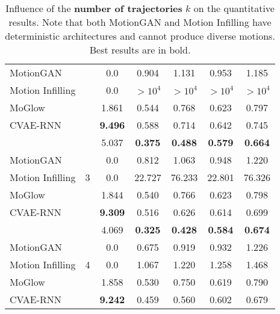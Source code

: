 \documentclass[10pt,twocolumn,letterpaper]{article}
\begin{document}
\begin{table}[t!]
\begin{tabular}{lcccccc}
              MotionGAN \cite{hernandez2019human} &   &            0.0 &          0.904 &          1.131 &          0.953 &          1.185 \\
Motion Infilling \cite{kaufmann2020convolutional} &   &            0.0 &     $>10^4$ &    $>10^4$ &     $>10^4$ &    $>10^4$ \\
                   MoGlow \cite{henter2020moglow} &   &          1.861 &          0.544 &          0.768 &          0.623 &          0.797 \\
                                         CVAE-RNN &   & \textbf{9.496} &          0.588 &          0.714 &          0.642 &          0.745 \\
    \midrule
                             \textbf{\trajevae{}} & \multirow{5}{*}{3}  &          5.037 & \textbf{0.375} & \textbf{0.488} & \textbf{0.579} & \textbf{0.664} \\
              MotionGAN \cite{hernandez2019human} &   &            0.0 &          0.812 &          1.063 &          0.948 &          1.220 \\
Motion Infilling \cite{kaufmann2020convolutional} &   &            0.0 &         22.727 &         76.233 &         22.801 &         76.326 \\
                   MoGlow \cite{henter2020moglow} &   &          1.844 &          0.540 &          0.766 &          0.623 &          0.798 \\
                                         CVAE-RNN &   & \textbf{9.309} &          0.516 &          0.626 &          0.614 &          0.699 \\
    \midrule
                             \textbf{\trajevae{}} & \multirow{5}{*}{4}  &          4.069 & \textbf{0.325} & \textbf{0.428} & \textbf{0.584} & \textbf{0.674} \\
              MotionGAN \cite{hernandez2019human} &   &            0.0 &          0.675 &          0.919 &          0.932 &          1.226 \\
Motion Infilling \cite{kaufmann2020convolutional} &   &            0.0 &          1.067 &          1.220 &          1.258 &          1.468 \\
                   MoGlow \cite{henter2020moglow} &   &          1.858 &          0.530 &          0.750 &          0.619 &          0.790 \\
                                         CVAE-RNN &   & \textbf{9.242} &          0.459 &          0.560 &          0.602 &          0.679 \\
    \bottomrule
\end{tabular}
\caption{Influence of the \textbf{number of trajectories} $k$ on the quantitative results. Note that both MotionGAN \cite{hernandez2019human} and Motion Infilling \cite{kaufmann2020convolutional} have deterministic architectures and cannot produce diverse motions.
Best results are in bold. }
\label{tab:controllability-experiment}                                
\vspace{-1.5em}
\end{table}                                          
\end{document}
